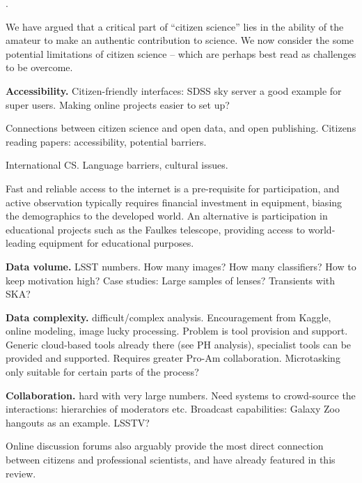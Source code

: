 \documentclass{ar2e}
\begin{document}
.

We have argued that a critical part of ``citizen science'' lies in the ability
of the amateur to make an authentic contribution to science. We now consider the
some potential limitations of citizen science -- which are perhaps best read as
challenges to be overcome. 

\begin{description}

\item{\bf Accessibility.} Citizen-friendly interfaces: SDSS sky server a good example
for super users. Making online projects easier to set up? 

Connections between citizen science and open data, and open publishing. 
Citizens reading papers: accessibility, potential barriers. 

International CS. Language barriers, cultural issues. 

Fast and reliable access  to the internet is
a pre-requisite for participation, and active  observation typically requires
financial investment in equipment,  biasing the demographics to the developed
world.  An alternative is  participation in educational projects such as the
Faulkes telescope,  providing access to world-leading equipment for
educational purposes.

\item{\bf Data volume.} LSST numbers. How many images? How many classifiers? How to keep
motivation high? Case studies: Large samples of lenses?  Transients with SKA? 

\item{\bf Data complexity.} difficult/complex analysis. Encouragement from Kaggle, online
modeling, image lucky processing. Problem is tool provision and support.
Generic cloud-based tools
already there (see PH analysis), specialist tools can be provided and supported.
Requires greater Pro-Am collaboration. Microtasking only suitable for certain parts of the
process?

\item{\bf Collaboration.} hard with very large numbers. Need systems to crowd-source the
interactions: hierarchies of moderators etc. Broadcast capabilities: Galaxy Zoo
hangouts as an example. LSSTV?

Online discussion forums also 
arguably provide the most direct connection between citizens and professional
scientists, and have already featured in this review.  


\end{description}
\end{document}
